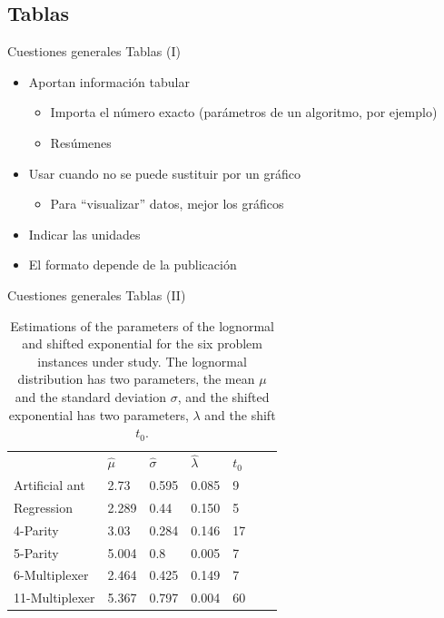 \documentclass{beamer}
\begin{document}
\subsection{Tablas}
\begin{frame}{Cuestiones generales} {Tablas (I)}
	\begin{itemize}
		\item Aportan información tabular
			\begin{itemize}
			\item Importa el número exacto (parámetros de un algoritmo, por ejemplo)
			\item Resúmenes
			\end{itemize}
		\item Usar cuando no se puede sustituir por un gráfico
			\begin{itemize}
			\item Para ``visualizar'' datos, mejor los gráficos
			\end{itemize}
		\item Indicar las unidades
		\item El formato depende de la publicación
	\end{itemize}
\end{frame}

\begin{frame}{Cuestiones generales} {Tablas (II)}
	\footnotesize{\begin{table}[t]
	\begin{center}
	\renewcommand{\arraystretch}{1.3}
	\caption{Estimations of the parameters of the lognormal and shifted exponential for the six problem instances under study. The lognormal distribution has two parameters, the mean $\mu$ and the standard deviation $\sigma$, and the shifted exponential has two parameters, $\lambda$ and the shift $t_0$.\label{tab:exponential}}
	\begin{tabular}{lllllll}
	\hline\noalign{\smallskip}
      & $\hat{\mu}$   & $\hat{\sigma}$ &  $\hat{\lambda}$ & $t_0$ \\
	\noalign{\smallskip} 
	\hline 
	\noalign{\smallskip}
	Artificial ant  & 2.73  & 0.595 & 0.085  & 9    \\ 
	Regression      & 2.289 & 0.44  & 0.150  & 5    \\ 
	4-Parity        & 3.03  & 0.284 & 0.146  & 17   \\ 
	5-Parity        & 5.004 & 0.8   & 0.005  & 7    \\ 
	6-Multiplexer   & 2.464 & 0.425 & 0.149  & 7    \\ 
	11-Multiplexer  & 5.367 & 0.797 & 0.004  & 60   \\ 
	\hline
	\end{tabular}
	\end{center}
	\end{table}}
\end{frame}
\end{document}
